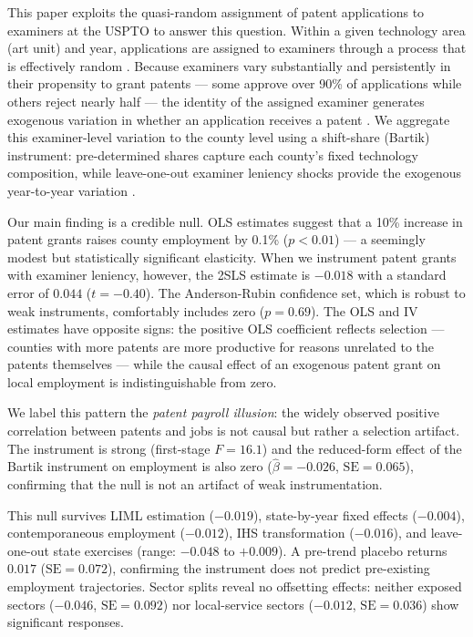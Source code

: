 \documentclass[12pt]{article}
\begin{document}
This paper exploits the quasi-random assignment of patent applications to examiners at the USPTO to answer this question. Within a given technology area (art unit) and year, applications are assigned to examiners through a process that is effectively random \citep{lemley2012examiner,righi2023patent}. Because examiners vary substantially and persistently in their propensity to grant patents --- some approve over 90\% of applications while others reject nearly half --- the identity of the assigned examiner generates exogenous variation in whether an application receives a patent \citep{sampat2019examiners,farre2020patent}. We aggregate this examiner-level variation to the county level using a shift-share (Bartik) instrument: pre-determined shares capture each county's fixed technology composition, while leave-one-out examiner leniency shocks provide the exogenous year-to-year variation \citep{goldsmith2020bartik,borusyak2022shift}.

Our main finding is a credible null. OLS estimates suggest that a 10\% increase in patent grants raises county employment by 0.1\% ($p<0.01$) --- a seemingly modest but statistically significant elasticity. When we instrument patent grants with examiner leniency, however, the 2SLS estimate is $-0.018$ with a standard error of $0.044$ ($t=-0.40$). The Anderson-Rubin confidence set, which is robust to weak instruments, comfortably includes zero ($p=0.69$). The OLS and IV estimates have opposite signs: the positive OLS coefficient reflects selection --- counties with more patents are more productive for reasons unrelated to the patents themselves --- while the causal effect of an exogenous patent grant on local employment is indistinguishable from zero.

We label this pattern the \textit{patent payroll illusion}: the widely observed positive correlation between patents and jobs is not causal but rather a selection artifact. The instrument is strong (first-stage $F=16.1$) and the reduced-form effect of the Bartik instrument on employment is also zero ($\hat{\beta}=-0.026$, $\text{SE}=0.065$), confirming that the null is not an artifact of weak instrumentation.

This null survives LIML estimation ($-0.019$), state-by-year fixed effects ($-0.004$), contemporaneous employment ($-0.012$), IHS transformation ($-0.016$), and leave-one-out state exercises (range: $-0.048$ to $+0.009$). A pre-trend placebo returns $0.017$ ($\text{SE}=0.072$), confirming the instrument does not predict pre-existing employment trajectories. Sector splits reveal no offsetting effects: neither exposed sectors ($-0.046$, $\text{SE}=0.092$) nor local-service sectors ($-0.012$, $\text{SE}=0.036$) show significant responses.
\end{document}
